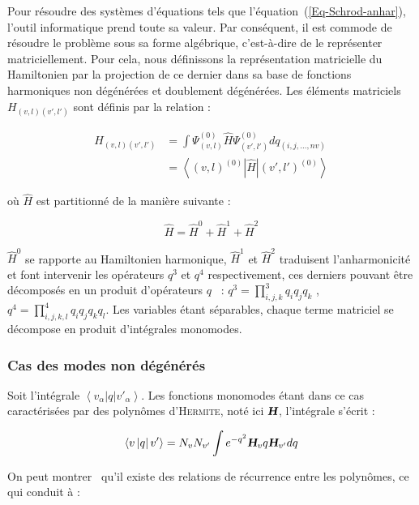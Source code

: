 Pour résoudre des systèmes d'équations tels que l'équation~(\ref*{Eq-Schrod-anhar}), l'outil informatique prend toute sa valeur. Par conséquent, il est commode de résoudre le problème sous sa forme algébrique, c'est-à-dire de le représenter matriciellement. Pour cela, nous définissons la représentation matricielle du Hamiltonien par la projection de ce dernier dans sa base de fonctions harmoniques non dégénérées et doublement dégénérées. Les éléments matriciels $H_{(v,l)(v',l')}$ sont définis par la relation :

\begin{align}
	H_{(v,l)(v',l')} &= \int \Psi^{(0)}_{(v,l)} \hat{H} \Psi^{(0)}_{(v',l')}dq_{(i,j,\ldots ,nv)} \\
	        &= \left\langle (v,l)^{(0)}\right| \hat{H} \left| (v',l')^{(0)} \right\rangle 
\end{align}
 
\noindent où $\hat{H}$ est partitionné de la manière suivante : 

\begin{equation}
	\hat{H} = \hat{H}^0 + \hat{H}^1 + \hat{H}^2 
\end{equation}

$\hat{H}^0$ se rapporte au Hamiltonien harmonique, $\hat{H}^1$ et $\hat{H}^2$ traduisent l'anharmonicité et font intervenir les opérateurs $q^3$ et $q^4$ respectivement, ces derniers pouvant être décomposés en un produit d'opérateurs $q$~\cite{II-d-6} : $q^3 = \displaystyle{\prod^3_{i,j,k}q_iq_jq_k}$ , $q^4 = \displaystyle{\prod^4_{i,j,k,l}q_iq_jq_kq_l}$.
Les variables étant séparables, chaque terme matriciel se décompose en produit d'intégrales monomodes.

\subsubsection*{Cas des modes non dégénérés}

Soit l'intégrale $\left\langle v_{\alpha}\left|q \right|v'_{\alpha} \right\rangle$. Les fonctions monomodes étant dans ce cas caractérisées par des polynômes d'\textsc{Hermite}, noté ici $\textsl{\textbf{H}}$, l'intégrale s'écrit :

\begin{equation}
	\left\langle v \left|q \right|v' \right\rangle = N_v N_{v'} \int e^{-q^2} \textsl{\textbf{H}}_v q \textsl{\textbf{H}}_{v'} dq
\end{equation}

On peut montrer~\cite{II-9} qu'il existe des relations de récurrence entre les polynômes, ce qui conduit à :

